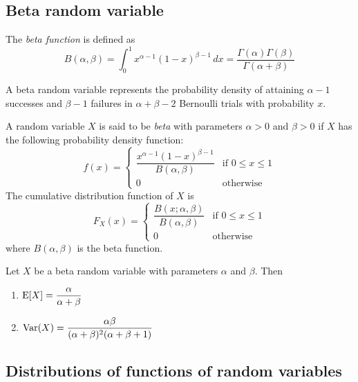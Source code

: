\documentclass{article}
\begin{document}
\subsection{Beta random variable}

\begin{definition}
  The \emph{beta function} is defined as
  \[
    B(\alpha, \beta) = \int_0^1 x^{\alpha - 1} (1 - x)^{\beta - 1} \, dx = \frac{\Gamma(\alpha) \Gamma(\beta)}{\Gamma(\alpha + \beta)}
  \]
\end{definition}

A beta random variable represents the probability density of attaining $\alpha - 1$ successes and $\beta - 1$ failures in $\alpha + \beta - 2$ Bernoulli trials with probability $x$.

\begin{definition}
  A random variable $X$ is said to be \emph{beta} with parameters $\alpha > 0$ and $\beta > 0$ if $X$ has the following probability density function:
  \[
    f(x) = \begin{cases}
      \dfrac{x^{\alpha - 1} (1 - x)^{\beta - 1}}{B(\alpha, \beta)} & \text{if } 0 \leq x \leq 1 \\
      0                                                            & \text{otherwise}
    \end{cases}
  \]
  The cumulative distribution function of $X$ is
  \[
    F_X(x) = \begin{cases}
      \dfrac{B(x; \alpha, \beta)}{B(\alpha, \beta)} & \text{if } 0 \leq x \leq 1 \\
      0                                             & \text{otherwise}
    \end{cases}
  \]
  where $B(\alpha, \beta)$ is the beta function.
\end{definition}

\begin{proposition}
  Let $X$ be a beta random variable with parameters $\alpha$ and $\beta$.
  Then
  \begin{enumerate}
    \item $\operatorname{E}[X] = \dfrac{\alpha}{\alpha + \beta}$
    \item $\operatorname{Var}(X) = \dfrac{\alpha \beta}{(\alpha + \beta)^2 (\alpha + \beta + 1)}$
  \end{enumerate}
\end{proposition}

\subsection{Distributions of functions of random variables}
\end{document}
